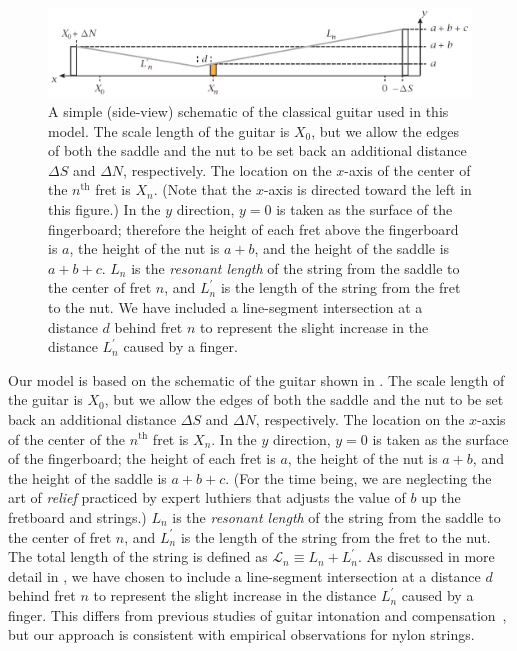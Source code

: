  \begin{figure}
  \centering
  \includegraphics[width=7.0in]{../figures/fretting_schematic}
  \caption{\label{fig:guitar_schematic} A simple (side-view) schematic of the classical guitar used in this model. The scale length of the guitar is $X_0$, but we allow the edges of both the saddle and the nut to be set back an additional distance $\Delta S$ and $\Delta N$, respectively. The location on the $x$-axis of the center of the $n^\textrm{th}$ fret is $X_n$. (Note that the $x$-axis is directed toward the left in this figure.) In the $y$ direction, $y = 0$ is taken as the surface of the fingerboard; therefore the height of each fret above the fingerboard is $a$, the height of the nut is $a + b$, and the height of the saddle is $a + b + c$. $L_n$ is the \emph{resonant length} of the string from the saddle to the center of fret $n$, and $L^\prime_n$ is the length of the string from the fret to the nut. We have included a line-segment intersection at a distance $d$ behind fret $n$ to represent the slight increase in the distance $L_n^\prime$ caused by a finger.}
 \end{figure}

Our model is based on the schematic of the guitar shown in . The scale length of the guitar is $X_0$, but we allow the edges of both the saddle and the nut to be set back an additional distance $\Delta S$ and $\Delta N$, respectively. The location on the $x$-axis of the center of the $n^\textrm{th}$ fret is $X_n$. In the $y$ direction, $y = 0$ is taken as the surface of the fingerboard; the height of each fret is $a$, the height of the nut is $a + b$, and the height of the saddle is $a + b + c$. (For the time being, we are neglecting the art of \emph{relief} practiced by expert luthiers that adjusts the value of $b$ up the fretboard and strings.) $L_n$ is the \emph{resonant length} of the string from the saddle to the center of fret $n$, and $L^\prime_n$ is the length of the string from the fret to the nut. The total length of the string is defined as $\mathcal{L}_n \equiv L_n + L^\prime_n$. As discussed in more detail in , we have chosen to include a line-segment intersection at a distance $d$ behind fret $n$ to represent the slight increase in the distance $L_n^\prime$ caused by a finger. This differs from previous studies of guitar intonation and compensation~\cite{ref:byers1996cgi,ref:varieschi2010icf}, but our approach is consistent with empirical observations for nylon strings.

